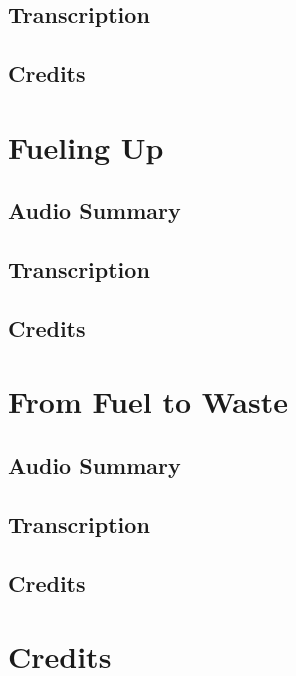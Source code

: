 \subsection{Transcription}

\subsection{Credits}

\section{Fueling Up}

\subsection{Audio Summary}

\subsection{Transcription}

\subsection{Credits}

\section{From Fuel to Waste}

\subsection{Audio Summary}

\subsection{Transcription}

\subsection{Credits}

\section{Credits}